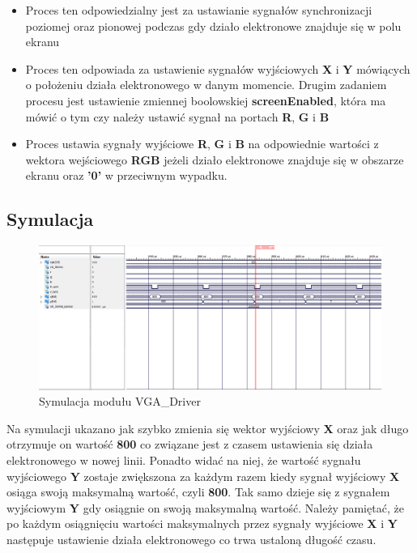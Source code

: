 \documentclass[a4paper]{report}
\begin{document}
			\begin{itemize}
				\item Proces ten odpowiedzialny jest za ustawianie sygnałów synchronizacji poziomej oraz pionowej podczas gdy działo elektronowe
				znajduje się w polu ekranu \\
					
				\item Proces ten odpowiada za ustawienie sygnałów wyjściowych \textbf{X} i \textbf{Y} mówiących o położeniu działa elektronowego
				w danym momencie. Drugim zadaniem procesu jest ustawienie zmiennej boolowskiej  \textbf{screenEnabled}, która ma mówić o tym czy
				należy ustawić sygnał na portach \textbf{R}, \textbf{G} i \textbf{B}\\
					
				\item Proces ustawia sygnały wyjściowe \textbf{R}, \textbf{G} i \textbf{B} na odpowiednie wartości z wektora wejściowego \textbf{RGB}
				jeżeli działo elektronowe znajduje się w obszarze ekranu oraz \textbf{'0'} w przeciwnym wypadku.\\
					
			\end{itemize}			
			
		\begin{landscape}
			\subsection{Symulacja}
				\begin{figure}[h!]
					\centering
					\includegraphics[width=1.6\textwidth]{vga_driver_symulacja2.png}
					\caption{Symulacja modułu VGA\_Driver}
				\end{figure}
			\justify
            Na symulacji ukazano jak szybko zmienia się wektor wyjściowy \textbf{X} oraz jak długo otrzymuje on wartość \textbf{800} co związane jest
            z czasem ustawienia się działa elektronowego w nowej linii. Ponadto widać na niej, że wartość sygnału wyjściowego \textbf{Y} zostaje
            zwiększona za każdym razem kiedy sygnał wyjściowy \textbf{X} osiąga swoją maksymalną wartość, czyli \textbf{800}. Tak samo dzieje się z
            sygnałem wyjściowym \textbf{Y} gdy osiągnie on swoją maksymalną wartość. Należy pamiętać, że po każdym osiągnięciu wartości maksymalnych
            przez sygnały wyjściowe \textbf{X} i \textbf{Y} następuje ustawienie działa elektronowego co trwa ustaloną długość czasu.
		\end{landscape}
		
\end{document}
